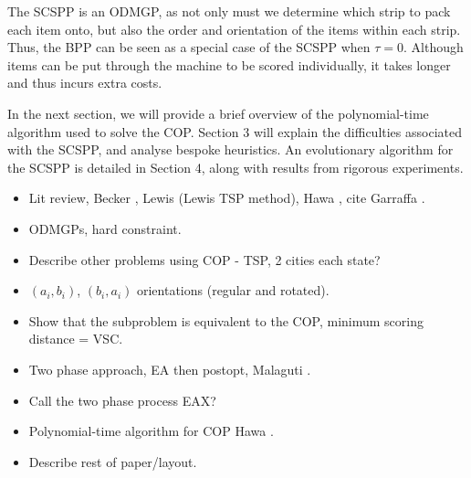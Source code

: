 \documentclass{elsarticle}
\begin{document}
The SCSPP is an ODMGP, as not only must we determine which strip to pack each item onto, but also the order and orientation of the items within each strip. Thus, the BPP can be seen as a special case of the SCSPP when $\tau = 0$. Although items can be put through the machine to be scored individually, it takes longer and thus incurs extra costs.


In the next section, we will provide a brief overview of the polynomial-time algorithm used to solve the COP. Section 3 will explain the difficulties associated with the SCSPP, and analyse bespoke heuristics. An evolutionary algorithm for the SCSPP is detailed in Section 4, along with results from rigorous experiments.  

{\color{Orange}
\begin{itemize}[leftmargin=*]
	\item Lit review, Becker \cite{becker2015}, Lewis \cite{lewis2011} (Lewis TSP method), Hawa \cite{hawa2018}, cite Garraffa \cite{garraffa2016}.
	\item ODMGPs, hard constraint.
	\item Describe other problems using COP - TSP, 2 cities each state?
	\item $(a_i, b_i)$, $(b_i, a_i)$ orientations (regular and rotated).
	\item Show that the subproblem is equivalent to the COP, minimum scoring distance = VSC.
	\item Two phase approach, EA then postopt, Malaguti \cite{malaguti2008}.
	\item Call the two phase process EAX?
	\item Polynomial-time algorithm for COP Hawa \cite{hawa2018}.
	\item Describe rest of paper/layout.
\end{itemize}
}
\end{document}
